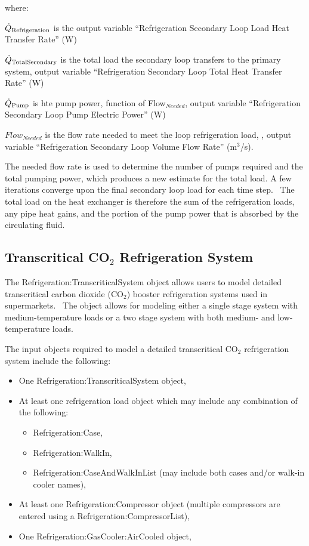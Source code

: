 where:

\({\dot Q_{{\rm{Refrigeration}}}}\) is the output variable ``Refrigeration Secondary Loop Load Heat Transfer Rate'' (W)

\({\dot Q_{{\rm{TotalSecondary}}}}\) is the total load the secondary loop transfers to the primary system, output variable ``Refrigeration Secondary Loop Total Heat Transfer Rate'' (W)

\({\dot Q_{{\rm{Pump}}}}\) is hte pump power, function of Flow\(_{Needed}\), output variable ``Refrigeration Secondary Loop Pump Electric Power'' (W)

\(Flow_{Needed}\) is the flow rate needed to meet the loop refrigeration load, , output variable ``Refrigeration Secondary Loop Volume Flow Rate'' (m\(^3\)/s).

The needed flow rate is used to determine the number of pumps required and the total pumping power, which produces a new estimate for the total load. A few iterations converge upon the final secondary loop load for each time step.~ The total load on the heat exchanger is therefore the sum of the refrigeration loads, any pipe heat gains, and the portion of the pump power that is absorbed by the circulating fluid.

\subsection{Transcritical CO\(_{2}\) Refrigeration System}\label{transcritical-co2-refrigeration-system}

The Refrigeration:TranscriticalSystem object allows users to model detailed transcritical carbon dioxide (CO\(_{2}\)) booster refrigeration systems used in supermarkets.~ The object allows for modeling either a single stage system with medium-temperature loads or a two stage system with both medium- and low-temperature loads.

The input objects required to model a detailed transcritical CO\(_{2}\) refrigeration system include the following:

\begin{itemize}
  \item One Refrigeration:TranscriticalSystem object,
  \item At least one refrigeration load object which may include any combination of the following:
  \begin{itemize}
    \item Refrigeration:Case,
    \item Refrigeration:WalkIn,
    \item Refrigeration:CaseAndWalkInList (may include both cases and/or walk-in cooler names),
  \end{itemize}
  \item At least one Refrigeration:Compressor object (multiple compressors are entered using a Refrigeration:CompressorList),
  \item One Refrigeration:GasCooler:AirCooled object,
\end{itemize}

